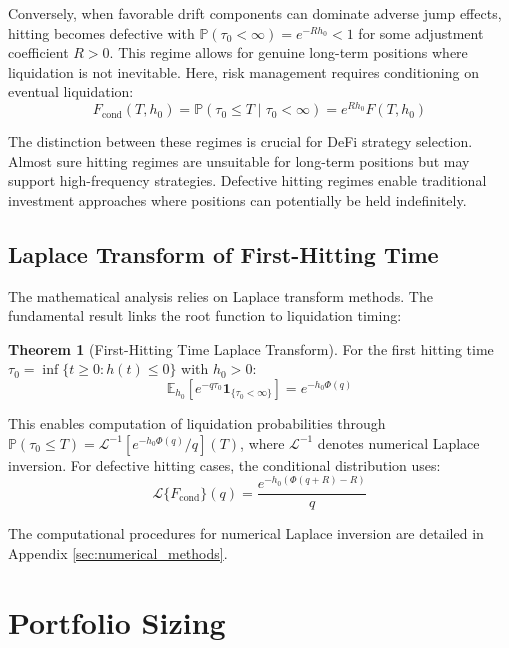 \documentclass{article}
\theoremstyle{definition}
\newtheorem{theorem}{Theorem}[section]
\begin{document}
Conversely, when favorable drift components can dominate adverse jump effects, hitting becomes defective with $\mathbb{P}(\tau_0 < \infty) = e^{-R h_0} < 1$ for some adjustment coefficient $R > 0$. This regime allows for genuine long-term positions where liquidation is not inevitable. Here, risk management requires conditioning on eventual liquidation:
\begin{equation}
F_{\mathrm{cond}}(T,h_0) = \mathbb{P}(\tau_0 \leq T \mid \tau_0 < \infty) = e^{R h_0} F(T,h_0)
\end{equation}

The distinction between these regimes is crucial for DeFi strategy selection. Almost sure hitting regimes are unsuitable for long-term positions but may support high-frequency strategies. Defective hitting regimes enable traditional investment approaches where positions can potentially be held indefinitely.

\subsection{Laplace Transform of First-Hitting Time}

The mathematical analysis relies on Laplace transform methods. The fundamental result links the root function to liquidation timing:

\begin{theorem}[First-Hitting Time Laplace Transform]
\label{thm:fht_laplace_section3}
For the first hitting time $\tau_0 = \inf\{t \geq 0 : h(t) \leq 0\}$ with $h_0 > 0$:
\begin{equation}
\mathbb{E}_{h_0}[e^{-q \tau_0} \mathbf{1}_{\{\tau_0 < \infty\}}] = e^{-h_0 \Phi(q)}
\end{equation}
\end{theorem}

This enables computation of liquidation probabilities through $\mathbb{P}(\tau_0 \leq T) = \mathcal{L}^{-1}[e^{-h_0 \Phi(q)}/q](T)$, where $\mathcal{L}^{-1}$ denotes numerical Laplace inversion. For defective hitting cases, the conditional distribution uses:
\begin{equation}
\mathcal{L}\{F_{\mathrm{cond}}\}(q) = \frac{e^{-h_0 (\Phi(q+R) - R)}}{q}
\end{equation}

The computational procedures for numerical Laplace inversion are detailed in Appendix \ref{sec:numerical_methods}.


\section{Portfolio Sizing}
\end{document}
